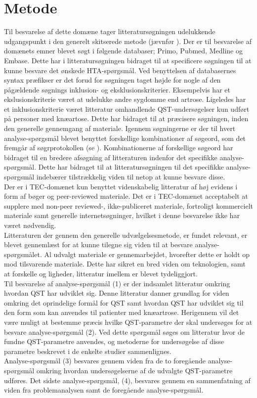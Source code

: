 \section{Metode}
Til besvarelse af dette domæne tager litteratursøgningen udelukkende udgangspunkt i den generelt skitserede metode (jævnfør ). Der er til besvarelse af domænets emner blevet søgt i følgende databaser; Primo, Pubmed, Medline og Embase. Dette har i litteratursøgningen bidraget til at specificere søgningen til at kunne besvare det ønskede HTA-spørgsmål. Ved benyttelsen af databasernes syntax præfikser er det forud for søgningen taget højde for nogle af den pågældende søgnings inklusion- og eksklusionskriterier. Eksempelvis har et ekslusionskriterie været at udelukke andre sygdomme end artrose. Ligeledes har et inklusionskriterie været litteratur omhandlende QST-undersøgelser kun udført på personer med knæartose. Dette har bidraget til at præcisere søgningen, inden den generelle gennemgang af materiale. Igennem søgningerne er der til hvert analyse-spørgsmål blevet benyttet forskellige kombinationer af søgeord, som det fremgår af søgrprotokollen (se ). Kombinationerne af forskellige søgeord har bidraget til en bredere afsøgning af litteraturen indenfor det specifikke analyse-spørgsmål. Dette har bidraget til at litteratursøgningen til det specifikke analyse-spørgsmål indebærer tilstrækkelig viden til netop at kunne besvare disse. \\
Der er i TEC-domænet kun benyttet videnskabelig litteratur af høj evidens i form af bøger og peer-reviewed materiale. Det er i TEC-domænet acceptabelt at supplere med non-peer reviewed-, ikke-publiceret materiale, fortroligt kommercielt materiale samt generelle internetsøgninger, hvilket i denne besvarelse ikke har været nødvendig. \citep{HTAcore} \\
Litteraturen der gennem den generelle udvælgelsesmetode, er fundet relevant, er blevet gennemlæst for at kunne tilegne sig viden til at besvare analyse-spørgsmålet. Al udvalgt materiale er gennemarbejdet, hvorefter dette er holdt op mod tilsvarende materiale. Dette har sikret en bred viden om teknologien, samt at forskelle og ligheder, litteratur imellem er blevet tydeliggjort. \\
Til besvarelse af analyse-spørgsmål (1) er der indsamlet litteratur omkring hvordan QST har udviklet sig. Denne litteratur danner grundlag for viden omkring det oprindelige formål for QST samt hvordan QST har udviklet sig til den form som kan anvendes til patienter med knæartrose. Herigennem vil det være muligt at bestemme præcis hvilke QST-parametre der skal undersøges for at besvare analyse-spørgsmål (2). Ved dette spørgsmål søges om litteratur hvor de fundne QST-parametre anvendes, og metoderne for undersøgelse af disse parametre beskrevet i de enkelte studier sammenlignes. \\
Analyse-spørgsmål (3) besvares gennem viden fra de to foregående analyse-spørgsmål omkring hvordan undersøgelserne af de udvalgte QST-parametre udføres. Det sidste analyse-spørgsmål, (4), besvares gennem en sammenfatning af viden fra problemanalysen samt de foregående analyse-spørgsmål.    
 
